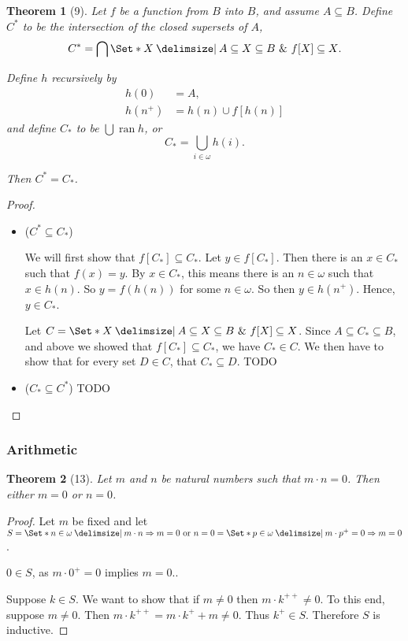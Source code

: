 \documentclass[12pt]{article}
\theoremstyle{plain}
\newtheorem*{exthm}{Theorem}
\theoremstyle{remark}
\theoremstyle{definition}
\theoremstyle{remark}
\providecommand\st{}
\newcommand\SetSymbol[1][]{%
  \nonscript\:#1\vert%
  \allowbreak%
  \nonscript\:
\mathopen{}}
\renewcommand\st{\SetSymbol[\delimsize]}
\DeclareMathOperator{\ran}{ran}
\begin{document}
\begin{exthm}[9]
  Let $f$ be a function from $B$ into $B$, and assume $A \subseteq B$. Define $C^*$ to be the intersection of the closed supersets of $A$,
  \begin{equation*}
    C^* = \bigcap \Set*{X \st A \subseteq X \subseteq B \ \&\ f[X] \subseteq X}.
  \end{equation*}

  Define $h$ recursively by
  \begin{align*}
    h(0) &= A,\\
    h(n^+) &= h(n) \cup f[h(n)]
  \end{align*}
  and define $C_*$ to be $\bigcup \ran{h}$, or
  \begin{equation*}
    C_* = \bigcup_{i \in \omega} h(i).
  \end{equation*}

  Then $C^* = C_*$.
\end{exthm}
\begin{proof}
  \begin{itemize}
    \item ($C^* \subseteq C_*$)

      We will first show that $f[C_*] \subseteq C_*$. Let $y \in f[C_*]$. Then there is an $x \in C_*$ such that $f(x) = y$. By $x \in C_*$, this means there is an $n \in \omega$ such that $x \in h(n)$. So $y = f(h(n))$ for some $n \in \omega$. So then $y \in h(n^+)$. Hence, $y \in C_*$.

      Let $C = \Set*{X \st A \subseteq X \subseteq B \ \&\ f[X] \subseteq X}$. Since $A \subseteq C_* \subseteq B$, and above we showed that $f[C_*] \subseteq C_*$, we have $C_* \in C$. We then have to show that for every set $D \in C$, that $C_* \subseteq D$. TODO

    \item ($C_* \subseteq C^*$) TODO
  \end{itemize}
\end{proof}

\subsubsection{Arithmetic}
\begin{exthm}[13]
  Let $m$ and $n$ be natural numbers such that $m \cdot n = 0$. Then either $m = 0$ or $n = 0$.
\end{exthm}
\begin{proof}
  Let $m$ be fixed and let $S = \Set*{n \in \omega \st m \cdot n \Rightarrow m = 0 \text{ or } n = 0} = \Set*{p \in \omega \st m \cdot p^+ = 0 \Rightarrow m = 0}$.

  $0 \in S$, as $m \cdot 0^+ = 0$ implies $m = 0$..

  Suppose $k \in S$. We want to show that if $m \neq 0$ then $m \cdot k^{++} \neq 0$. To this end, suppose $m \neq 0$. Then $m \cdot k^{++} = m \cdot k^+ +m \neq 0$. Thus $k^+ \in S$. Therefore $S$ is inductive.
\end{proof}
\end{document}
